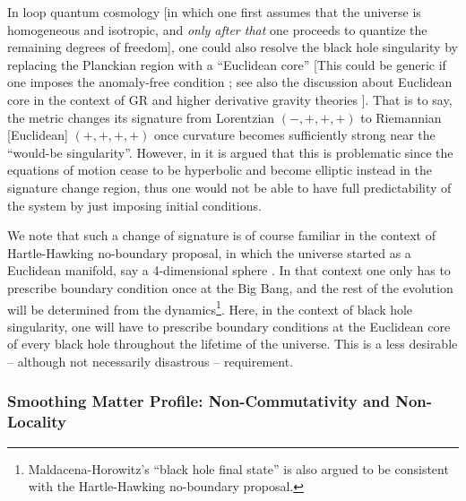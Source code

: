 \documentclass[12pt]{article}
\newcommand{\2}{$^2$}
\newcommand{\3}{$^3$}
\newcommand{\4}{$_4$}
\newcommand{\5}{$_5$}
\begin{document}
In loop quantum cosmology [in which one first assumes that the universe is homogeneous and isotropic, and \emph{only after that} one proceeds to quantize the remaining degrees of freedom], one could also resolve the black hole singularity by replacing the Planckian region with a ``Euclidean core'' [This could be generic if one imposes the anomaly-free condition \cite{Bojowald}; see also the discussion about Euclidean core in the context of GR and higher derivative gravity theories \cite{hirayama}]. That is to say, the metric changes its signature from Lorentzian $(-,+,+,+)$ to Riemannian [Euclidean] $(+,+,+,+)$ once curvature becomes sufficiently strong near the ``would-be singularity''. However, in \cite{Bojowald} it is argued that this is problematic since the equations of motion cease to be hyperbolic and become elliptic instead in the signature change region, thus one would not be able to have full predictability of the system by just imposing initial conditions. 

We note that such a change of signature is of course familiar in the context of Hartle-Hawking no-boundary proposal, in which the universe started as a Euclidean manifold, say a 4-dimensional sphere \cite{HartleHawking}. In that context one only has to prescribe boundary condition once at the Big Bang, and the rest of the evolution will be determined from the dynamics\footnote{Maldacena-Horowitz's ``black hole final state'' \cite{MalHor} is also argued to be consistent with the Hartle-Hawking no-boundary proposal.}. Here, in the context of black hole singularity, one will have to prescribe boundary conditions at the Euclidean core of  every black hole throughout the lifetime of the universe. This is a less desirable -- although not necessarily disastrous -- requirement.


\subsubsection{Smoothing Matter Profile: Non-Commutativity and Non-Locality}\label{smoothing}
\end{document}
